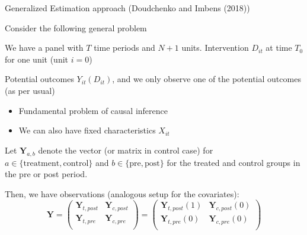 \documentclass[notes,11pt, aspectratio=169]{beamer}
\newenvironment{wideitemize}{\itemize\addtolength{\itemsep}{10pt}}{\enditemize}
\begin{document}
\begin{frame}{Generalized Estimation approach (Doudchenko and Imbens (2018))}

  \begin{wideitemize}
  \item Consider the following general problem
    \item We have a panel with $T$ time periods and $N+1$
      units. Intervention $D_{it}$ at time $T_{0}$ for one unit (unit $i = 0$)
    \item Potential outcomes $Y_{it}(D_{it})$, and we only observe one
      of the potential outcomes (as per usual)
      \begin{itemize}
      \item Fundamental problem of causal inference
      \item We can also have fixed characteristics $X_{it}$
      \end{itemize}
    \item Let $\mathbf{Y}_{a,b}$ denote the vector (or matrix in
      control case) for $a \in \{\text{treatment}, \text{control}\}$ and
      $b \in \{\text{pre}, \text{post}\}$ for the treated and control
      groups in the pre or post period.
    \item Then, we have observations (analogous setup for the covariates):
      \begin{equation*}
        \mathbf{Y} = \left( \begin{array}{cc}
                              \mathbf{Y}_{t,post} & \mathbf{Y}_{c,post} \\
                              \mathbf{Y}_{t,pre} & \mathbf{Y}_{c,pre} \\
                            \end{array}
                            \right) =  \left( \begin{array}{cc}
                              \mathbf{Y}_{t,post}(1) & \mathbf{Y}_{c,post}(0) \\
                              \mathbf{Y}_{t,pre}(0) & \mathbf{Y}_{c,pre}(0) \\
                            \end{array}
                            \right) 
      \end{equation*}
  \end{wideitemize}
\end{frame}
\end{document}
